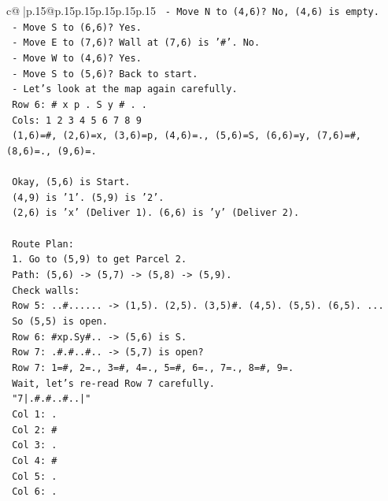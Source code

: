 \documentclass{article}
\begin{document}
{\begin{supertabular}{c@{$\;$}|p{.15\linewidth}@{}p{.15\linewidth}p{.15\linewidth}p{.15\linewidth}p{.15\linewidth}p{.15\linewidth}}
{{{\texttt{   {-} Move N to (4,6)? No, (4,6) is empty.} \\
\texttt{   {-} Move S to (6,6)? Yes.} \\
\texttt{   {-} Move E to (7,6)? Wall at (7,6) is '\#'. No.} \\
\texttt{   {-} Move W to (4,6)? Yes.} \\
\texttt{   {-} Move S to (5,6)? Back to start.} \\
\texttt{   {-} Let's look at the map again carefully.} \\
\texttt{   Row 6: \# x p . S y \# . .} \\
\texttt{   Cols: 1 2 3 4 5 6 7 8 9} \\
\texttt{   (1,6)=\#, (2,6)=x, (3,6)=p, (4,6)=., (5,6)=S, (6,6)=y, (7,6)=\#, (8,6)=., (9,6)=.} \\
\\ 
\texttt{   Okay, (5,6) is Start.} \\
\texttt{   (4,9) is '1'. (5,9) is '2'.} \\
\texttt{   (2,6) is 'x' (Deliver 1). (6,6) is 'y' (Deliver 2).} \\
\\ 
\texttt{   Route Plan:} \\
\texttt{   1. Go to (5,9) to get Parcel 2.} \\
\texttt{      Path: (5,6) {-}> (5,7) {-}> (5,8) {-}> (5,9).} \\
\texttt{      Check walls:} \\
\texttt{      Row 5: ..\#...... {-}> (1,5). (2,5). (3,5)\#. (4,5). (5,5). (6,5). ...} \\
\texttt{      So (5,5) is open.} \\
\texttt{      Row 6: \#xp.Sy\#.. {-}> (5,6) is S.} \\
\texttt{      Row 7: .\#.\#..\#.. {-}> (5,7) is open?} \\
\texttt{      Row 7: 1=\#, 2=., 3=\#, 4=., 5=\#, 6=., 7=., 8=\#, 9=.} \\
\texttt{      Wait, let's re{-}read Row 7 carefully.} \\
\texttt{      "7|.\#.\#..\#..|"} \\
\texttt{      Col 1: .} \\
\texttt{      Col 2: \#} \\
\texttt{      Col 3: .} \\
\texttt{      Col 4: \#} \\
\texttt{      Col 5: .} \\
\texttt{      Col 6: .} \\
}}}
\end{supertabular}}
\end{document}
